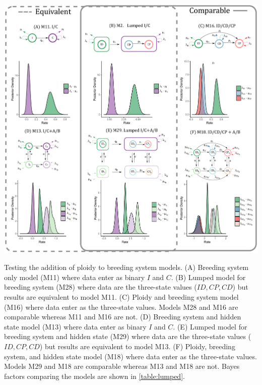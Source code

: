 \begin{suppfigure}
\includegraphics[width=\textwidth]{figS16.pdf}
\caption{Testing the addition of ploidy to breeding system models. (A) Breeding system only model (M11) where data enter as binary $I$ and $C$. (B) Lumped model for breeding system (M28) where data are the three-state values ($ID,CP,CD$) but results are equivalent to model M11.  (C) Ploidy and breeding system model (M16) where  data enter as the three-state values. Models M28 and M16 are comparable whereas M11 and M16 are not. (D) Breeding system and hidden state model (M13) where data enter as binary $I$ and $C$. (E) Lumped model for breeding system and hidden state (M29) where data are the three-state values ($ID,CP,CD$) but results are equivalent to model M13. (F) Ploidy, breeding system, and hidden state model (M18) where  data enter as the three-state values. Models M29 and M18 are comparable whereas M13 and M18 are not. Bayes factors comparing the models are shown in \cref{table:lumped}.} %
\label{suppfigure:lumpedIC}
\end{suppfigure}


